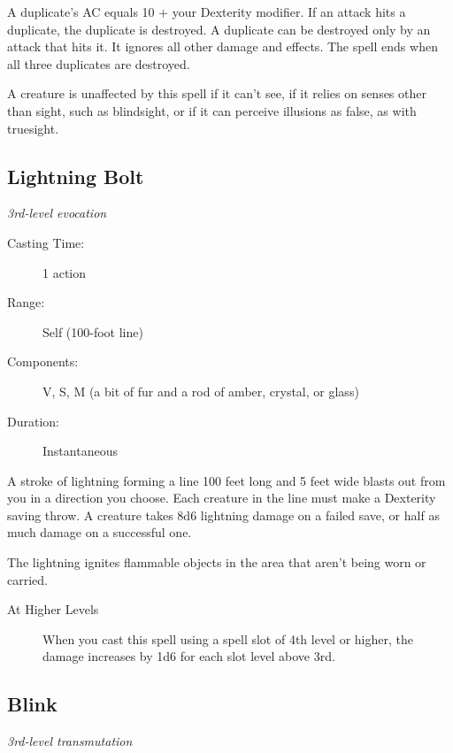 \documentclass[letterpaper,10pt,twoside,twocolumn,openany]{book}
\begin{document}
A duplicate's AC equals 10 + your Dexterity modifier. If an attack hits a duplicate, the duplicate is destroyed. A duplicate can be destroyed only by an attack that hits it. It ignores all other damage and effects. The spell ends when all three duplicates are destroyed.

A creature is unaffected by this spell if it can't see, if it relies on senses other than sight, such as blindsight, or if it can perceive illusions as false, as with truesight. 

\subsection{Lightning Bolt} \hypertarget{Lightning Bolt}{}
\begin{hangingpar}
	\textit{3rd-level evocation}
\end{hangingpar}

\begin{description}
	\item[Casting Time:] 1 action
	\item[Range:] Self (100-foot line)
	\item[Components:] V, S, M (a bit of fur and a rod of amber, crystal, or glass) 
	\item[Duration:] Instantaneous
\end{description}

A stroke of lightning forming a line 100 feet long and 5 feet wide blasts out from you in a direction you choose. Each creature in the line must make a Dexterity saving throw. A creature takes 8d6 lightning damage on a failed save, or half as much damage on a successful one.

The lightning ignites flammable objects in the area that aren't being worn or carried. 

\begin{description}
	\item[At Higher Levels] When you cast this spell using a spell slot of 4th level or higher, the damage increases by 1d6 for each slot level above 3rd.
\end{description}

\subsection{Blink} \hypertarget{Blink}{}
\begin{hangingpar}
	\textit{3rd-level transmutation}
\end{hangingpar}
\end{document}

